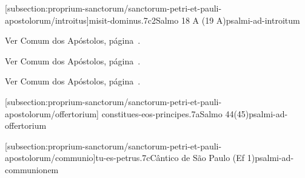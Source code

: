 \def\Prefix{subsection:proprium-sanctorum/sanctorum-petri-et-pauli-apostolorum}

[\Prefix/introitus]{misit-dominus.7c2}{Salmo 18 A (19 A)}{psalmi-ad-introitum}

\begin{rubrica}
	Ver Comum dos Apóstolos, página~\pageref{subsection:communia/commune-apostolorum/psalmus-responsorius}.
\end{rubrica}
\vspace{-2mm}

\begin{rubrica}
	Ver Comum dos Apóstolos, página~\pageref{subsection:communia/commune-apostolorum/alleluia}.
\end{rubrica}
\vspace{-2mm}

\begin{rubrica}
	Ver Comum dos Apóstolos, página~\pageref{subsection:communia/commune-apostolorum/psalmus-alleluiaticus}.
\end{rubrica}
\vspace{-2mm}


[\Prefix/offertorium]
{constitues-eos-principes.7a}{Salmo 44(45)}{psalmi-ad-offertorium}

\AllowPageBreak

[\Prefix/communio]{tu-es-petrus.7c}{Cântico de São Paulo (Ef 1)}{psalmi-ad-communionem}